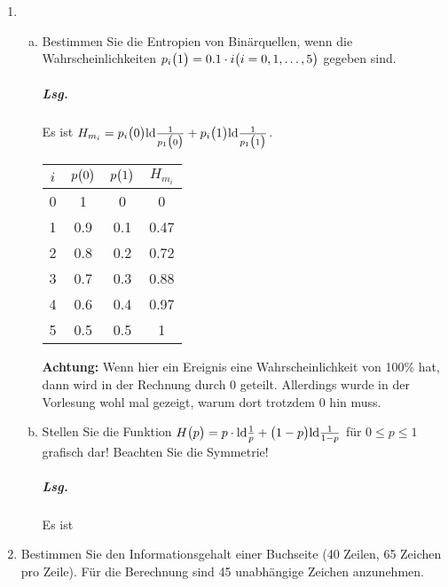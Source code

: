 \documentclass{scrreprt}
\newcommand{\ld}{\text{ld}}
\begin{document}
\begin{enumerate}[1.]
\newpage
\item
  \begin{enumerate}[(a)]
  \item Bestimmen Sie die Entropien von Binärquellen, wenn die Wahrscheinlichkeiten
    $p_i \qty\big(1) = 0.1 \cdot i \qty\big(i = 0, 1, \ldots, 5)$ gegeben sind.

    \subparagraph{Lsg.} Es ist $H_{m_i} = p_i\qty\big(0) \ld\frac{1}{p_1\qty\big(0)} +
    p_i\qty\big(1) \ld\frac{1}{p_1\qty\big(1)}$.

    \begin{tabular}{c|c|c|c}
      $i$ & $p\qty\big(0)$ & $p\qty\big(1)$ & $H_{m_i}$ \\
      \hline
      0 & 1   & 0   & 0 \\
      1 & 0.9 & 0.1 & 0.47 \\
      2 & 0.8 & 0.2 & 0.72 \\
      3 & 0.7 & 0.3 & 0.88 \\
      4 & 0.6 & 0.4 & 0.97\\
      5 & 0.5 & 0.5 & 1 \\
    \end{tabular}

    \textbf{Achtung:} Wenn hier ein Ereignis eine Wahrscheinlichkeit von 100\%
    hat, dann wird in der Rechnung durch 0 geteilt.
    Allerdings wurde in der Vorlesung wohl mal gezeigt, warum dort trotzdem 0
    hin muss.

  \item Stellen Sie die Funktion $H\qty\big(p) = p \cdot \ld \frac{1}{p} +
    \qty\big(1 - p)\ld\frac{1}{1 - p}$ für
    $0 \leq p \leq 1$ grafisch dar!
    Beachten Sie die Symmetrie!

    \subparagraph{Lsg.} Es ist

  \end{enumerate}

\newpage
\item Bestimmen Sie den Informationsgehalt einer Buchseite (40 Zeilen,
  65 Zeichen pro Zeile).
  Für die Berechnung sind 45 unabhängige Zeichen anzunehmen.


\end{enumerate}
\end{document}

